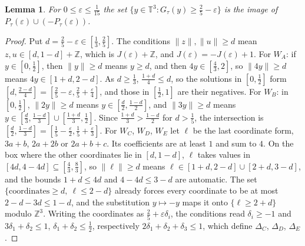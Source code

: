 \documentclass[12pt]{amsart}
\newtheorem{lemma}[theorem]{Lemma}
\theoremstyle{definition}\newtheorem{definition}[theorem]{Definition}
\theoremstyle{remark}\newtheorem{remark}[theorem]{Remark}
\newcommand{\Z}{\mathbb Z}\newcommand{\R}{\mathbb R}\newcommand{\T}{\mathbb T}
\newcommand{\norm}[1]{\lVert #1\rVert}
\begin{document}
\begin{lemma}\label{lem:fivecells}
For $0\le\varepsilon\le\frac1{15}$ the set $\{y\in\T^3:G_\tau(y)\ge\frac25-\varepsilon\}$ is the image of $P_\tau(\varepsilon)\cup(-P_\tau(\varepsilon))$.
\end{lemma}
\begin{proof}
Put $d=\frac25-\varepsilon\in[\frac13,\frac25]$. The conditions $\norm z,\norm u\ge d$ mean $z,u\in[d,1-d]+\Z$, which is $J(\varepsilon)+\Z$, and $J(\varepsilon)=-J(\varepsilon)+1$. For $W_A$: if $y\in[0,\frac12]$, then $\norm y\ge d$ means $y\ge d$, and then $4y\in[\frac43,2]$, so $\norm{4y}\ge d$ means $4y\in[1+d,2-d]$. As $d\ge\frac13$, $\frac{1+d}4\le d$, so the solutions in $[0,\frac12]$ form $[d,\frac{2-d}4]=[\frac25-\varepsilon,\frac25+\frac\varepsilon4]$, and those in $[\frac12,1]$ are their negatives. For $W_B$: in $[0,\frac12]$, $\norm{2y}\ge d$ means $y\in[\frac d2,\frac{1-d}2]$, and $\norm{3y}\ge d$ means $y\in[\frac d3,\frac{1-d}3]\cup[\frac{1+d}3,\frac12]$. Since $\frac{1+d}3>\frac{1-d}2$ for $d>\frac15$, the intersection is $[\frac d2,\frac{1-d}3]=[\frac15-\frac\varepsilon2,\frac15+\frac\varepsilon3]$. For $W_C$, $W_D$, $W_E$ let $\ell$ be the last coordinate form, $3a+b$, $2a+2b$ or $2a+b+c$. Its coefficients are at least $1$ and sum to $4$. On the box where the other coordinates lie in $[d,1-d]$, $\ell$ takes values in $[4d,4-4d]\subseteq[\frac43,\frac83]$, so $\norm\ell\ge d$ means $\ell\in[1+d,2-d]\cup[2+d,3-d]$, and the bounds $1+d\le 4d$ and $4-4d\le 3-d$ are automatic. The set $\{\text{coordinates}\ge d,\ \ell\le 2-d\}$ already forces every coordinate to be at most $2-d-3d\le 1-d$, and the substitution $y\mapsto -y$ maps it onto $\{\ell\ge 2+d\}$ modulo $\Z^3$. Writing the coordinates as $\frac25+\varepsilon\delta_i$, the conditions read $\delta_i\ge-1$ and $3\delta_1+\delta_2\le1$, $\delta_1+\delta_2\le\frac12$, respectively $2\delta_1+\delta_2+\delta_3\le1$, which define $\Delta_C$, $\Delta_D$, $\Delta_E$.
\end{proof}
\end{document}

